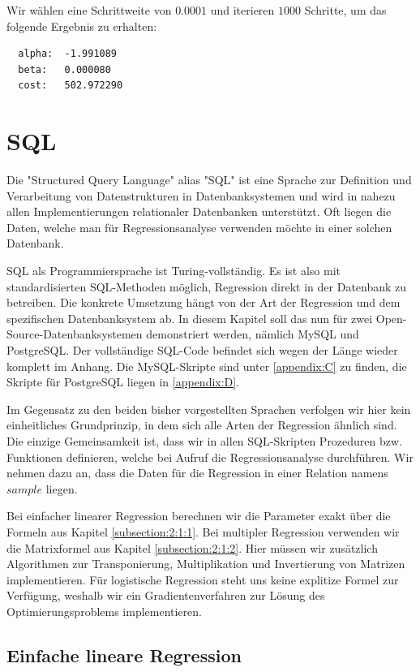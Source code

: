 Wir wählen eine Schrittweite von $0.0001$ und iterieren $1000$ Schritte, um das folgende Ergebnis zu erhalten:

\begin{verbatim}
  alpha:  -1.991089
  beta:   0.000080
  cost:   502.972290
\end{verbatim}

\section{SQL}
\label{section:3:4}

Die "Structured Query Language" alias "SQL" ist eine Sprache zur Definition und Verarbeitung von Datenstrukturen in Datenbanksystemen und wird in nahezu allen Implementierungen relationaler Datenbanken unterstützt. Oft liegen die Daten, welche man für Regressionsanalyse verwenden möchte in einer solchen Datenbank.

SQL als Programmiersprache ist Turing-vollständig. Es ist also mit standardisierten SQL-Methoden möglich, Regression direkt in der Datenbank zu betreiben. Die konkrete Umsetzung hängt von der Art der Regression und dem spezifischen Datenbanksystem ab. In diesem Kapitel soll das nun für zwei Open-Source-Datenbanksystemen demonstriert werden, nämlich MySQL und PostgreSQL. Der vollständige SQL-Code befindet sich wegen der Länge wieder komplett im Anhang. Die MySQL-Skripte sind unter \ref{appendix:C} zu finden, die Skripte für PostgreSQL liegen in \ref{appendix:D}.

Im Gegensatz zu den beiden bisher vorgestellten Sprachen verfolgen wir hier kein einheitliches Grundprinzip, in dem sich alle Arten der Regression ähnlich sind. Die einzige Gemeinsamkeit ist, dass wir in allen SQL-Skripten Prozeduren bzw. Funktionen definieren, welche bei Aufruf die Regressionsanalyse durchführen. Wir nehmen dazu an, dass die Daten für die Regression in einer Relation namens $sample$ liegen.

Bei einfacher linearer Regression berechnen wir die Parameter exakt über die Formeln aus Kapitel \ref{subsection:2:1:1}. Bei multipler Regression verwenden wir die Matrixformel aus Kapitel \ref{subsection:2:1:2}. Hier müssen wir zusätzlich Algorithmen zur Transponierung, Multiplikation und Invertierung von Matrizen implementieren. Für logistische Regression steht uns keine explitize Formel zur Verfügung, weshalb wir ein Gradientenverfahren zur Lösung des Optimierungsproblems implementieren.

\subsection{Einfache lineare Regression}
\label{subsection:3:4:1}

